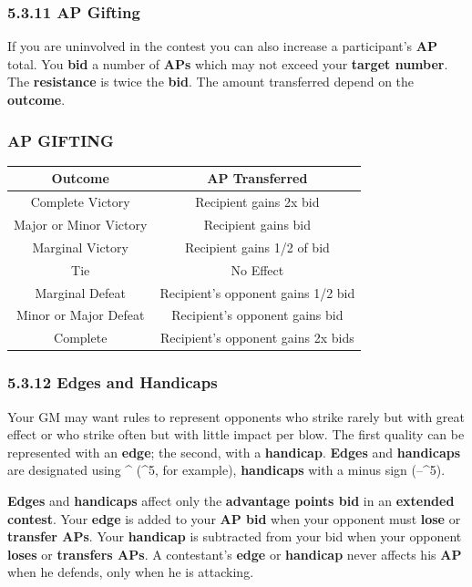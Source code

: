 \documentclass[
]{article}
\begin{document}
\hypertarget{ap-gifting}{%
\subsubsection{5.3.11 AP Gifting}\label{ap-gifting}}

If you are uninvolved in the contest you can also increase a
participant's \textbf{AP} total. You \textbf{bid} a number of
\textbf{APs} which may not exceed your \textbf{target number}. The
\textbf{resistance} is twice the \textbf{bid}. The amount transferred
depend on the \textbf{outcome}.

\hypertarget{ap-gifting-1}{%
\subsubsection{AP GIFTING}\label{ap-gifting-1}}

\begin{longtable}[]{@{}cc@{}}
\toprule
Outcome & AP Transferred\tabularnewline
\midrule
\endhead
Complete Victory & Recipient gains 2x bid\tabularnewline
Major or Minor Victory & Recipient gains bid\tabularnewline
Marginal Victory & Recipient gains 1/2 of bid\tabularnewline
Tie & No Effect\tabularnewline
Marginal Defeat & Recipient's opponent gains 1/2 bid\tabularnewline
Minor or Major Defeat & Recipient's opponent gains bid\tabularnewline
Complete & Recipient's opponent gains 2x bids\tabularnewline
\bottomrule
\end{longtable}

\hypertarget{edges-and-handicaps}{%
\subsubsection{5.3.12 Edges and Handicaps}\label{edges-and-handicaps}}

Your GM may want rules to represent opponents who strike rarely but with
great effect or who strike often but with little impact per blow. The
first quality can be represented with an \textbf{edge}; the second, with
a \textbf{handicap}. \textbf{Edges} and \textbf{handicaps} are
designated using \^{} (\^{}5, for example), \textbf{handicaps} with a
minus sign (--\^{}5).

\textbf{Edges} and \textbf{handicaps} affect only the \textbf{advantage
points bid} in an \textbf{extended contest}. Your \textbf{edge} is added
to your \textbf{AP bid} when your opponent must \textbf{lose} or
\textbf{transfer APs}. Your \textbf{handicap} is subtracted from your
bid when your opponent \textbf{loses} or \textbf{transfers APs}. A
contestant's \textbf{edge} or \textbf{handicap} never affects his
\textbf{AP} when he defends, only when he is attacking.
\end{document}

